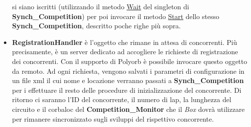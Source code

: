 \begin{itemize}
si siano iscritti (utilizzando il metodo \underline{Wait} del singleton di \textbf{Synch\_Competition}) per poi invocare il metodo \underline{Start} dello
stesso \textbf{Synch\_Competition}, descritto poche righe pi\`{u} sopra.
\item \textbf{RegistrationHandler} \`{e} l'oggetto che rimane in attesa di concorrenti. Pi\`{u} precisamente, \`{e} un server dedicato ad accogliere
le richieste di registrazione dei concorrenti. Con il supporto di Polyorb \`{e} possibile invocare questo oggetto da remoto. Ad ogni richiesta,
vengono salvati i parametri di configurazione in un file xml il cui nome e locazione verranno passati a \textbf{Synch\_Competition} per
i effettuare il resto delle procedure di inizializzazione del concorrente. Di ritorno ci saranno l'ID del concorrente, il numero di lap,
la lunghezza del circuito e il corbaloc 
del \textbf{Competition\_Monitor} che il \emph{Box} dovr\`{a} utilizzare per rimanere sincronizzato sugli sviluppi del rispettivo concorrente.
\end{itemize}
